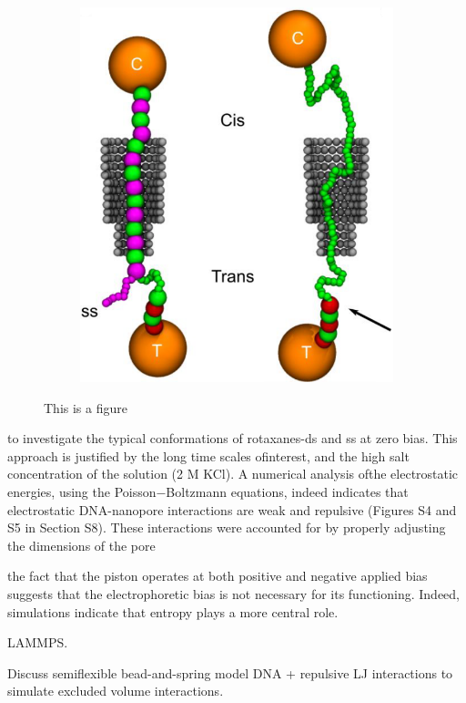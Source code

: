 \begin{figure}[ht]
\begin{centering}
\begin{subfigure}[t]{\dimexpr.5\linewidth-1.3em\relax}
  \includegraphics[width=0.9\linewidth,valign=t]{Figures/Stefanos2.png}
  \end{subfigure}
  \caption{This is a figure}
  \label{fig:test}
  \end{centering}
\end{figure}

to investigate the typical conformations of rotaxanes-ds and ss at zero bias. This
approach is justified by the long time scales ofinterest, and the high salt concentration
of the solution (2 M KCl). A numerical analysis ofthe electrostatic energies, using the
Poisson−Boltzmann equations, indeed indicates that electrostatic DNA-nanopore
interactions are weak and repulsive (Figures S4 and S5 in Section S8). These interactions
were accounted for by properly adjusting the dimensions of the pore

the fact that the piston operates at both positive and negative applied bias suggests
that the electrophoretic bias is not necessary for its functioning. Indeed, simulations
indicate that entropy plays a more central role.

LAMMPS.

Discuss semiflexible bead-and-spring model DNA + repulsive LJ interactions to simulate
excluded volume interactions.

